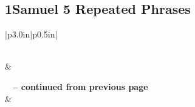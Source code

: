 \subsection{1Samuel 5 Repeated Phrases}


\normalsize
 
\begin{center}
\begin{longtable}{|p{3.0in}|p{0.5in}|}
\caption[1Samuel 5 Repeated Phrases]{1Samuel 5 Repeated Phrases}\label{table:Repeated Phrases 1Samuel 5} \\
\hline {} &  \\ \hline 
\endfirsthead
 
{{\bfseries \tablename\ \thetable{} -- continued from previous page}} \\  
\hline {} &  \\ \hline 
\endhead
 

\end{longtable}
\end{center}
